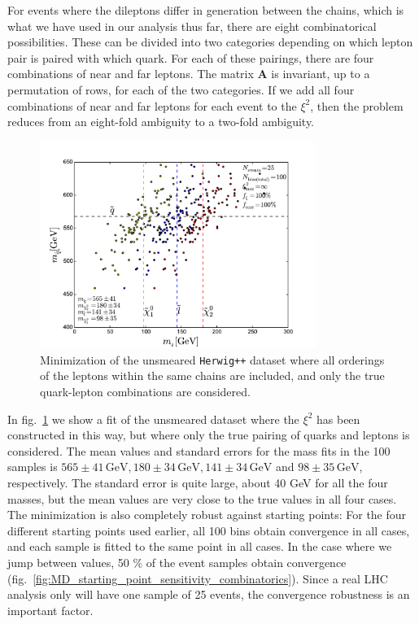 \documentclass[twoside,english]{uiofysmaster}
\begin{document}
For events where the dileptons differ in generation between the chains, which is what we have used in our analysis thus far, there are eight combinatorical possibilities. These can be divided into two categories depending on which lepton pair is paired with which quark. For each of these pairings, there are four combinations of near and far leptons. The matrix $\mathbf{A}$ is invariant, up to a permutation of rows, for each of the two categories. If we add all four combinations of near and far leptons for each event to the $\xi^2$, then the problem reduces from an eight-fold ambiguity to a two-fold ambiguity. 
\begin{figure}[hbt]
	\centering
	\includegraphics[width=0.8\textwidth]{figures/improving_combinatorics/herwigpp-4combosum-fit-nocomb-nosmear-nocut.pdf} 
	\caption{Minimization of the unsmeared {\tt Herwig++} dataset where all orderings of the leptons within the same chains are included, and only the true quark-lepton combinations are considered.}
	\label{fig:4combosum_nocomb-nosmear}
\end{figure}
In fig.\ \ref{fig:4combosum_nocomb-nosmear} we show a fit of the unsmeared dataset where the $\xi^2$ has been constructed in this way, but where only the true pairing of quarks and leptons is considered. The mean values and standard errors for the mass fits in the 100 samples is $565 \pm 41\, \mathrm{GeV}, 180 \pm 34\, \mathrm{GeV}, 141 \pm 34\, \mathrm{GeV}$ and $98 \pm 35\, \mathrm{GeV}$, respectively. The standard error is quite large, about 40 GeV for all the four masses, but the mean values are very close to the true values in all four cases. The minimization is also completely robust against starting points: For the four different starting points used earlier, all 100 bins obtain convergence in all cases, and each sample is fitted to the same point in all cases. In the case where we jump between values, 50 \% of the event samples obtain convergence (fig.\ \ref{fig:MD_starting_point_sensitivity_combinatorics}). Since a real LHC analysis only will have one sample of 25 events, the convergence robustness is an important factor. 
\end{document}

